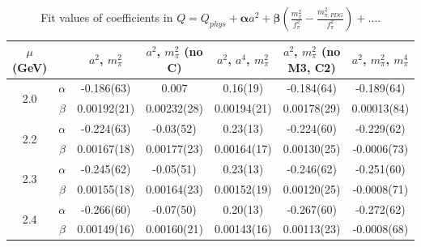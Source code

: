 \documentclass[12pt]{extarticle}
\begin{document}
\begin{table}[h!]
\begin{center}
\begin{tabular}{|c c|c|c|c|c|c|}
\hline
$\mu$ (GeV) &  & $a^2$, $m_\pi^2$& $a^2$, $m_\pi^2$ (no C)& $a^2$, $a^4$, $m_\pi^2$& $a^2$, $m_\pi^2$ (no M3, C2)& $a^2$, $m_\pi^2$, $m_\pi^4$\\
\hline
\multirow{2}{0.5in}{2.0} & $\alpha$ & -0.186(63)& 0.007& 0.16(19)& -0.184(64)& -0.189(64)\\
 & $\beta$ & 0.00192(21)& 0.00232(28)& 0.00194(21)& 0.00178(29)& 0.00013(84)\\
\hline
\multirow{2}{0.5in}{2.2} & $\alpha$ & -0.224(63)& -0.03(52)& 0.23(13)& -0.224(60)& -0.229(62)\\
 & $\beta$ & 0.00167(18)& 0.00177(23)& 0.00164(17)& 0.00130(25)& -0.0006(73)\\
\hline
\multirow{2}{0.5in}{2.3} & $\alpha$ & -0.245(62)& -0.05(51)& 0.23(13)& -0.246(62)& -0.251(60)\\
 & $\beta$ & 0.00155(18)& 0.00164(23)& 0.00152(19)& 0.00120(25)& -0.0008(71)\\
\hline
\multirow{2}{0.5in}{2.4} & $\alpha$ & -0.266(60)& -0.07(50)& 0.20(13)& -0.267(60)& -0.272(62)\\
 & $\beta$ & 0.00149(16)& 0.00160(21)& 0.00143(16)& 0.00113(23)& -0.0008(68)\\
\hline
\end{tabular}
\caption{Fit values of coefficients in $Q = Q_{phys} + \mathbf{\alpha} a^2 + \mathbf{\beta}\left(\frac{m_\pi^2}{f_\pi^2}-\frac{m_{\pi,PDG}^2}{f_\pi^2}\right) + \ldots$.}
\end{center}
\end{table}




















\clearpage
\end{document}

